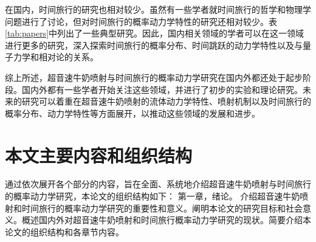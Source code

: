 在国内，时间旅行的研究也相对较少。虽然有一些学者就时间旅行的哲学和物理学问题进行了讨论，但对时间旅行的概率动力学特性的研究还相对较少。表\ref{tab:papers}中列出了一些典型研究。因此，国内相关领域的学者可以在这一领域进行更多的研究，深入探索时间旅行的概率分布、时间跳跃的动力学特性以及与量子力学和相对论的关系。
\begin{table}[htbp]
  \caption{时间旅行概率动力学研究论文情况}
  \centering
  \label{tab:papers}
\end{table}

综上所述，超音速牛奶喷射与时间旅行的概率动力学研究在国内外都还处于起步阶段。国内外都有一些学者开始关注这些领域，并进行了初步的实验和理论研究。未来的研究可以着重在超音速牛奶喷射的流体动力学特性、喷射机制以及时间旅行的概率分布、动力学特性等方面展开，以推动这些领域的发展和进步。


\section{本文主要内容和组织结构}
通过依次展开各个部分的内容，旨在全面、系统地介绍超音速牛奶喷射与时间旅行的概率动力学研究，本论文的组织结构如下：
第一章，绪论。
介绍超音速牛奶喷射和时间旅行的概率动力学研究的重要性和意义。阐明本论文的研究目标和社会意义。概述国内外对超音速牛奶喷射和时间旅行概率动力学研究的现状。简要介绍本论文的组织结构和各章节内容。

